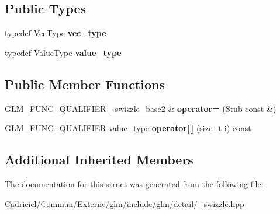 \subsection*{Public Types}
\begin{DoxyCompactItemize}
\item 
typedef Vec\+Type {\bfseries vec\+\_\+type}\hypertarget{structglm_1_1detail_1_1__swizzle__base2_3_01_value_type_00_01_p_00_01_vec_type_00_01_n_00_01_e0_fc19218d69dc8988a4a57fbe7f79725c_aa478e9f198b8832d76245adde9c627ec}{}\label{structglm_1_1detail_1_1__swizzle__base2_3_01_value_type_00_01_p_00_01_vec_type_00_01_n_00_01_e0_fc19218d69dc8988a4a57fbe7f79725c_aa478e9f198b8832d76245adde9c627ec}

\item 
typedef Value\+Type {\bfseries value\+\_\+type}\hypertarget{structglm_1_1detail_1_1__swizzle__base2_3_01_value_type_00_01_p_00_01_vec_type_00_01_n_00_01_e0_fc19218d69dc8988a4a57fbe7f79725c_aea7ec681454787ad7a322c06aec98757}{}\label{structglm_1_1detail_1_1__swizzle__base2_3_01_value_type_00_01_p_00_01_vec_type_00_01_n_00_01_e0_fc19218d69dc8988a4a57fbe7f79725c_aea7ec681454787ad7a322c06aec98757}

\end{DoxyCompactItemize}
\subsection*{Public Member Functions}
\begin{DoxyCompactItemize}
\item 
G\+L\+M\+\_\+\+F\+U\+N\+C\+\_\+\+Q\+U\+A\+L\+I\+F\+I\+ER \hyperlink{structglm_1_1detail_1_1__swizzle__base2}{\+\_\+swizzle\+\_\+base2} \& {\bfseries operator=} (Stub const \&)\hypertarget{structglm_1_1detail_1_1__swizzle__base2_3_01_value_type_00_01_p_00_01_vec_type_00_01_n_00_01_e0_fc19218d69dc8988a4a57fbe7f79725c_aed2b7223090d020e28af46eb33fe6729}{}\label{structglm_1_1detail_1_1__swizzle__base2_3_01_value_type_00_01_p_00_01_vec_type_00_01_n_00_01_e0_fc19218d69dc8988a4a57fbe7f79725c_aed2b7223090d020e28af46eb33fe6729}

\item 
G\+L\+M\+\_\+\+F\+U\+N\+C\+\_\+\+Q\+U\+A\+L\+I\+F\+I\+ER value\+\_\+type {\bfseries operator\mbox{[}$\,$\mbox{]}} (size\+\_\+t i) const \hypertarget{structglm_1_1detail_1_1__swizzle__base2_3_01_value_type_00_01_p_00_01_vec_type_00_01_n_00_01_e0_fc19218d69dc8988a4a57fbe7f79725c_a2f3a45edbb24ca7e12182c3123dde632}{}\label{structglm_1_1detail_1_1__swizzle__base2_3_01_value_type_00_01_p_00_01_vec_type_00_01_n_00_01_e0_fc19218d69dc8988a4a57fbe7f79725c_a2f3a45edbb24ca7e12182c3123dde632}

\end{DoxyCompactItemize}
\subsection*{Additional Inherited Members}


The documentation for this struct was generated from the following file\+:\begin{DoxyCompactItemize}
\item 
Cadriciel/\+Commun/\+Externe/glm/include/glm/detail/\+\_\+swizzle.\+hpp\end{DoxyCompactItemize}
